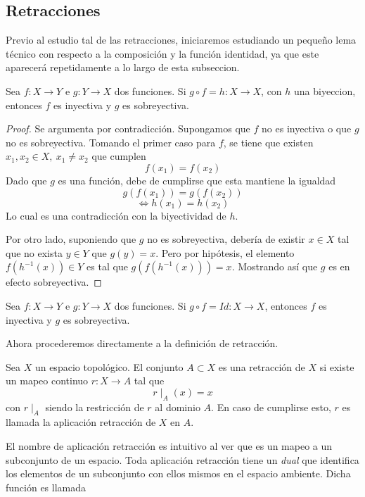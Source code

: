 \subsection{Retracciones}
Previo al estudio tal de las retracciones, iniciaremos estudiando un
pequeño lema técnico con respecto a la composición y la función
identidad, ya que este aparecerá repetidamente a lo largo de esta
subseccion.
\begin{lema}
  Sea \(f : X \to Y\) e \(g : Y \to X\) dos funciones. Si \( g \circ f =
  h : X \to X \), con \(h\) una biyeccion, entonces \(f\) es inyectiva y
  \(g\) es sobreyectiva.
\end{lema}
\begin{proof}
  Se argumenta por contradicción. Supongamos que \(f\) no es inyectiva o
  que \(g\) no es sobreyectiva. Tomando el primer caso para \(f\), se
  tiene que existen \(x_1 , x_2 \in X,\ x_1 \neq x_2\) que cumplen
  \[ f (x_1) = f(x_2) \]
  Dado que \(g\) es una función, debe de cumplirse que esta mantiene la igualdad
  \[ g (f (x_1)) = g (f(x_2)) \]
  \[ \iff h (x_1) = h(x_2) \]
  Lo cual es una contradicción con la biyectividad de \(h\).

  Por otro lado, suponiendo que \(g\) no es sobreyectiva, debería de
  existir \(x \in X\) tal que no exista \( y \in Y\) que \(g (y) = x\).
  Pero por hipótesis, el elemento \(f(h^{-1}(x)) \in Y\) es tal que \(g
  (f (h^{-1}(x))) = x\). Mostrando así que \(g\) es en efecto
  sobreyectiva.
\end{proof}
\begin{corolario} \label{thm:comp-identidad}
  Sea \(f : X \to Y\) e \(g : Y \to X\) dos funciones. Si \( g \circ f =
  Id : X \to X \), entonces \(f\) es inyectiva y \(g\) es sobreyectiva.
\end{corolario}
\noindent Ahora procederemos directamente a la definición
de retracción.
\begin{definicion}[Retracción]
  Sea \(X\) un espacio topológico. El conjunto \(A \subset X\) es una
  retracción de \(X\) si existe un mapeo continuo \(r : X \to A\) tal que
  \[ r \mid_{A} (x) = x \]
  con \(r \mid_{A}\) siendo la restricción de \(r\) al dominio \(A\). En
  caso de cumplirse esto, \(r\) es llamada la aplicación retracción de
  \(X\) en \(A\).
\end{definicion}
\noindent El nombre de aplicación retracción es intuitivo al ver que es
un mapeo a un subconjunto de un espacio. Toda aplicación retracción
tiene un \emph{dual} que identifica los elementos de un subconjunto con
ellos mismos en el espacio ambiente. Dicha función es llamada
